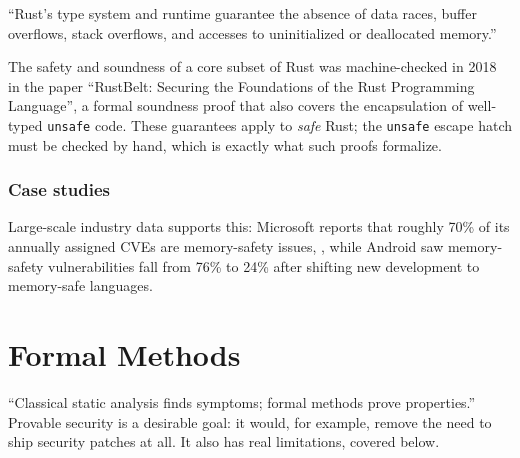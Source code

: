 \documentclass[conference]{IEEEtran}
\begin{document}
``Rust's type system and runtime guarantee the absence of data races, buffer overflows, stack overflows, and accesses to uninitialized or deallocated memory.'' \cite{matsakis2014rust}

The safety and soundness of a core subset of Rust was machine-checked in 2018 in the paper ``RustBelt: Securing the Foundations of the Rust Programming Language'', a formal soundness proof that also covers the encapsulation of well-typed \texttt{unsafe} code. \cite{jung2018rustbelt} These guarantees apply to \emph{safe} Rust; the \texttt{unsafe} escape hatch must be checked by hand, which is exactly what such proofs formalize.




\subsubsection{Case studies}
Large-scale industry data supports this: Microsoft reports that roughly 70\% of its annually assigned CVEs are memory-safety issues, \cite{miller2019bluehat, msrc2019saferlang}, while Android saw memory-safety vulnerabilities fall from 76\% to 24\% after shifting new development to memory-safe languages. \cite{vanderstoep2024android}


\section{Formal Methods}


``Classical static analysis finds symptoms; formal methods prove properties.'' Provable security is a desirable goal: it would, for example, remove the need to ship security patches at all. It also has real limitations, covered below.
\end{document}
